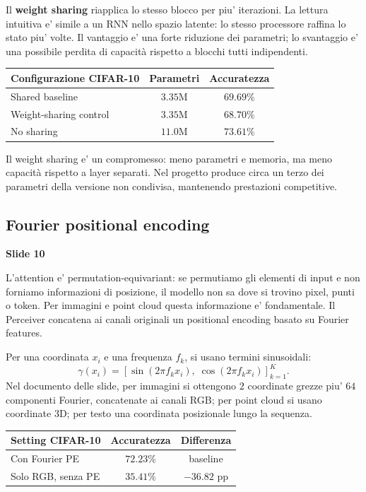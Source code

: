 \documentclass[11pt,a4paper]{article}
\newcommand{\slide}[1]{\textcolor{mainblue}{\textbf{Slide #1}}}
\begin{document}
Il \textbf{weight sharing} riapplica lo stesso blocco per piu' iterazioni. La
lettura intuitiva e' simile a un RNN nello spazio latente: lo stesso processore
raffina lo stato piu' volte. Il vantaggio e' una forte riduzione dei parametri;
lo svantaggio e' una possibile perdita di capacit\`a rispetto a blocchi tutti
indipendenti.

\begin{center}
\begin{tabular}{lcc}
\toprule
\textbf{Configurazione CIFAR-10} & \textbf{Parametri} & \textbf{Accuratezza} \\
\midrule
Shared baseline & $3.35$M & $69.69\%$ \\
Weight-sharing control & $3.35$M & $68.70\%$ \\
No sharing & $11.0$M & $73.61\%$ \\
\bottomrule
\end{tabular}
\end{center}

\begin{takeawaybox}
Il weight sharing e' un compromesso: meno parametri e memoria, ma meno
capacit\`a rispetto a layer separati. Nel progetto produce circa un terzo dei
parametri della versione non condivisa, mantenendo prestazioni competitive.
\end{takeawaybox}

\subsection{Fourier positional encoding}
\slide{10}

L'attention e' permutation-equivariant: se permutiamo gli elementi di input e
non forniamo informazioni di posizione, il modello non sa dove si trovino pixel,
punti o token. Per immagini e point cloud questa informazione e' fondamentale.
Il Perceiver concatena ai canali originali un positional encoding basato su
Fourier features.

Per una coordinata $x_i$ e una frequenza $f_k$, si usano termini sinusoidali:
\[
  \gamma(x_i)
  =
  \left[
    \sin(2\pi f_k x_i),\;
    \cos(2\pi f_k x_i)
  \right]_{k=1}^{K}.
\]
Nel documento delle slide, per immagini si ottengono $2$ coordinate grezze piu'
$64$ componenti Fourier, concatenate ai canali RGB; per point cloud si usano
coordinate 3D; per testo una coordinata posizionale lungo la sequenza.

\begin{center}
\begin{tabular}{lcc}
\toprule
\textbf{Setting CIFAR-10} & \textbf{Accuratezza} & \textbf{Differenza} \\
\midrule
Con Fourier PE & $72.23\%$ & baseline \\
Solo RGB, senza PE & $35.41\%$ & $-36.82$ pp \\
\bottomrule
\end{tabular}
\end{center}
\end{document}
